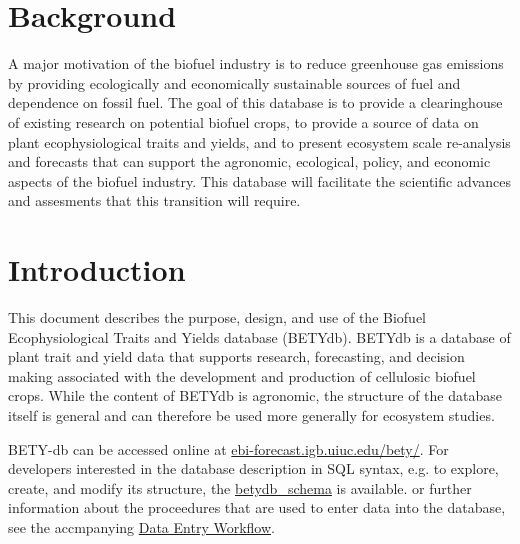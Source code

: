 \documentclass[10pt]{article}
\begin{document}

\section{Background}
 A major motivation of the biofuel industry is to reduce greenhouse gas emissions by providing ecologically and economically sustainable sources of fuel and dependence on fossil fuel.
 The goal of this database is to provide a clearinghouse of existing research on potential biofuel crops, to provide a source of data on plant ecophysiological traits and yields, and to present ecosystem scale re-analysis and forecasts that can support the agronomic, ecological, policy, and economic aspects of the biofuel industry.
 This database will facilitate the scientific advances and assesments that this transition will require.

\section{Introduction}
 This document describes the purpose, design, and use of the Biofuel Ecophysiological Traits and Yields database (BETYdb).
 BETYdb is a database of plant trait and yield data that supports research, forecasting, and decision making associated with the development and production of cellulosic biofuel crops.
 While the content of BETYdb is agronomic, the structure of the database itself is general and can therefore be used more generally for ecosystem studies.
 
  BETY-db can be accessed online at \href{http://ebi-forecast.igb.uiuc.edu/bety/}{ebi-forecast.igb.uiuc.edu/bety/}. 
  For developers interested in the database description in SQL syntax, e.g. to explore, create, and modify its structure, the \href{https://github.com/dlebauer/BETYdb/raw/master/betydb_schema.sql}{betydb\_schema} is available.
 or further information about the proceedures that are used to enter data into the database, see the accmpanying \href{https://netfiles.uiuc.edu/dlebauer/www/dbdocumentation_data_entry.pdf}{Data Entry Workflow}.
 
\end{document}
